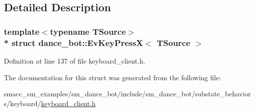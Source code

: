 \subsection{Detailed Description}
\subsubsection*{template$<$typename T\+Source$>$\\*
struct dance\+\_\+bot\+::\+Ev\+Key\+Press\+X$<$ T\+Source $>$}



Definition at line 137 of file keyboard\+\_\+client.\+h.



The documentation for this struct was generated from the following file\+:\begin{DoxyCompactItemize}
\item 
smacc\+\_\+sm\+\_\+examples/sm\+\_\+dance\+\_\+bot/include/sm\+\_\+dance\+\_\+bot/substate\+\_\+behaviors/keyboard/\hyperlink{keyboard__client_8h}{keyboard\+\_\+client.\+h}\end{DoxyCompactItemize}
